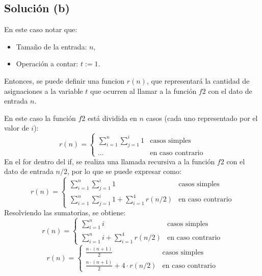 \subsection{Solución (b)}
En este caso notar que:
\begin{itemize}
    \item Tamaño de la entrada: $n$,
    \item Operación a contar: $t := 1$.
\end{itemize}
Entonces, se puede definir una funcion $r(n)$, que representará la cantidad de asignaciones a la variable $t$ que ocurren al llamar a la función $f2$ con el dato de entrada $n$.

En este caso la función $f2$ está dividida en $n$ casos (cada uno representado por el valor de $i$):
\begin{equation*}
    r(n) = 
    \begin{cases}
        \sum_{i=1}^{n} \sum_{j=1}^{i} 1 & \text{casos simples }  \\
        ... & \text{en caso contrario}
    \end{cases}
\end{equation*}
En el for dentro del if, se realiza una llamada recursiva a la función $f2$ con el dato de entrada $n/2$, por lo que se puede expresar como:
\begin{equation*}
    r(n) = 
    \begin{cases}
        \sum_{i=1}^{n} \sum_{j=1}^{i} 1 & \text{casos simples }  \\
        \sum_{i=1}^{n} \sum_{j=1}^{i} 1 +  \sum_{i=1}^{4} r(n/2) & \text{en caso contrario}
    \end{cases}
\end{equation*}
Resolviendo las sumatorias, se obtiene:
\begin{equation*}
    r(n) = 
    \begin{cases}
        \sum_{i=1}^{n} i & \text{casos simples }  \\
        \sum_{i=1}^{n} i +  \sum_{i=1}^{4} r(n/2) & \text{en caso contrario}
    \end{cases}
\end{equation*}
\begin{equation*}
    r(n) = 
    \begin{cases}
        \frac{n\cdot (n+1)}{2} & \text{casos simples }  \\
        \frac{n\cdot (n+1)}{2} + 4 \cdot r(n/2) & \text{en caso contrario}
    \end{cases}
\end{equation*}

